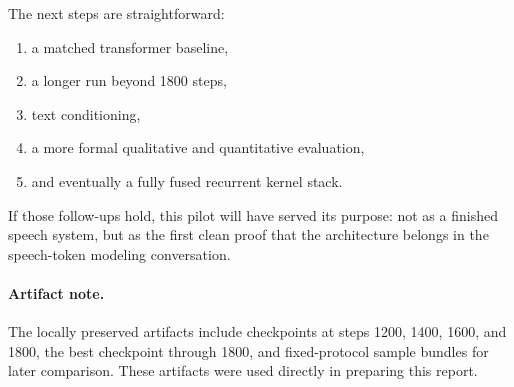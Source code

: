 \documentclass[11pt]{article}
\begin{document}
The next steps are straightforward:
\begin{enumerate}
    \item a matched transformer baseline,
    \item a longer run beyond 1800 steps,
    \item text conditioning,
    \item a more formal qualitative and quantitative evaluation,
    \item and eventually a fully fused recurrent kernel stack.
\end{enumerate}
If those follow-ups hold, this pilot will have served its purpose: not as a finished speech system, but as the first clean proof that the architecture belongs in the speech-token modeling conversation.

\paragraph{Artifact note.}
The locally preserved artifacts include checkpoints at steps 1200, 1400, 1600, and 1800, the best checkpoint through 1800, and fixed-protocol sample bundles for later comparison. These artifacts were used directly in preparing this report.



\end{document}
